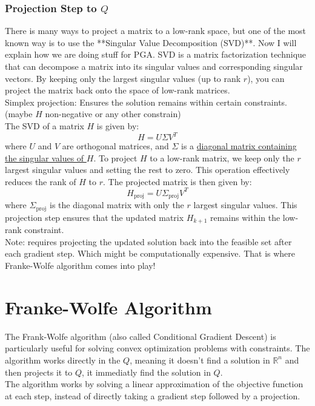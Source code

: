 \documentclass{article}
\begin{document}
\subsubsection*{Projection Step to $Q$}
There is many ways to project a matrix to a low-rank space, but one of the most known way is to use the **Singular Value Decomposition (SVD)**. Now I will explain how we are doing stuff for PGA. SVD is a matrix factorization technique that can decompose a matrix into its singular values and corresponding singular vectors. By keeping only the largest singular values (up to rank $r$), you can project the matrix back onto the space of low-rank matrices.\\ Simplex projection: Ensures the solution remains within certain constraints.(maybe $H$ non-negative or any other constrain) \\ 
The SVD of a matrix \( H \) is given by:
\[
H = U \Sigma V^T
\]
where \( U \) and \( V \) are orthogonal matrices, and \( \Sigma \) is a \underline{diagonal matrix containing } \underline{the singular values of \( H \)}. To project \( H \) to a low-rank matrix, we keep only the \( r \) largest singular values and setting the rest to zero. This operation effectively reduces the rank of \( H \) to \( r \). The projected matrix is then given by:
\[
H_{\text{proj}} = U \Sigma_{\text{proj}} V^T
\]
where \( \Sigma_{\text{proj}} \) is the diagonal matrix with only the \( r \) largest singular values. This projection step ensures that the updated matrix \( H_{k+1} \) remains within the low-rank constraint. \\
Note: requires projecting the updated solution back into the feasible set after each gradient step. Which might be computationally expensive. That is where Franke-Wolfe algorithm comes into play!
\section{Franke-Wolfe Algorithm}
The Frank-Wolfe algorithm (also called Conditional Gradient Descent) is particularly useful for solving convex optimization problems with constraints. The algorithm works directly in the $Q$, meaning it doesn't find a solution in $\mathbb{R}^n$ and then projects it to $Q$, it immediatly find the solution in $Q$. \\
The algorithm works by solving a linear approximation of the objective function at each step, instead of directly taking a gradient step followed by a projection.\\ 
\end{document}
